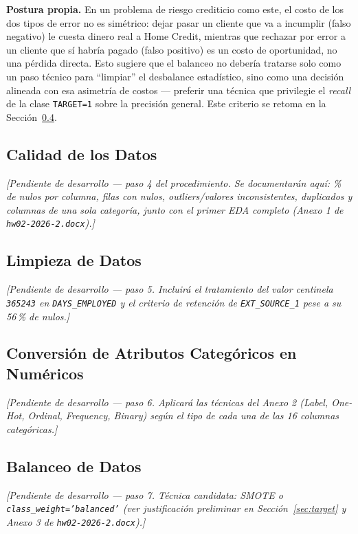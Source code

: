 \documentclass[conference]{IEEEtran}
\begin{document}
\textbf{Postura propia.} En un problema de riesgo crediticio como este,
el costo de los dos tipos de error no es simétrico: dejar pasar un
cliente que va a incumplir (falso negativo) le cuesta dinero real a Home
Credit, mientras que rechazar por error a un cliente que sí habría pagado
(falso positivo) es un costo de oportunidad, no una pérdida directa. Esto
sugiere que el balanceo no debería tratarse solo como un paso técnico
para ``limpiar'' el desbalance estadístico, sino como una decisión
alineada con esa asimetría de costos --- preferir una técnica que
privilegie el \emph{recall} de la clase \texttt{TARGET=1} sobre la
precisión general. Este criterio se retoma en la Sección~\ref{sec:balanceo}.

\subsection{Calidad de los Datos}
\textit{[Pendiente de desarrollo --- paso 4 del procedimiento. Se
documentarán aquí: \% de nulos por columna, filas con nulos,
outliers/valores inconsistentes, duplicados y columnas de una sola
categoría, junto con el primer EDA completo (Anexo 1 de
\texttt{hw02-2026-2.docx}).]}

\subsection{Limpieza de Datos}
\textit{[Pendiente de desarrollo --- paso 5. Incluirá el tratamiento del
valor centinela \texttt{365243} en \texttt{DAYS\_EMPLOYED} y el criterio
de retención de \texttt{EXT\_SOURCE\_1} pese a su 56\,\% de nulos.]}

\subsection{Conversión de Atributos Categóricos en Numéricos}
\label{sec:encoding}
\textit{[Pendiente de desarrollo --- paso 6. Aplicará las técnicas del
Anexo 2 (Label, One-Hot, Ordinal, Frequency, Binary) según el tipo de
cada una de las 16 columnas categóricas.]}

\subsection{Balanceo de Datos}
\label{sec:balanceo}
\textit{[Pendiente de desarrollo --- paso 7. Técnica candidata: SMOTE o
\texttt{class\_weight='balanced'} (ver justificación preliminar en
Sección~\ref{sec:target} y Anexo 3 de \texttt{hw02-2026-2.docx}).]}
\end{document}
